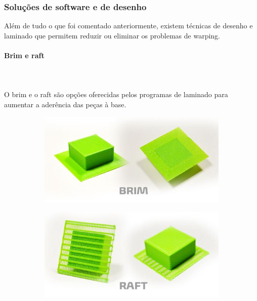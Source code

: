 \documentclass[11pt,a4paper]{article}
\begin{document}
		\subsubsection{Soluções de software e de desenho}Além de tudo o que foi comentado anteriormente, existem técnicas de desenho e laminado que permitem reduzir ou eliminar os problemas de warping.
			\paragraph{Brim e raft}\mbox{}\\\\
O brim e o raft são opções oferecidas pelos programas de laminado para aumentar a aderência das peças à base.
\begin{figure}[H]
    \centering
    \begin{subfigure}[b]{0.4\textwidth}
        \includegraphics[width=\textwidth,cfbox=azul_marcos 4pt 0pt]{FOTOS/BRIM}
    \end{subfigure}
    \qquad %
    \begin{subfigure}[b]{0.4\textwidth}
        \includegraphics[width=\textwidth,cfbox=azul_marcos 4pt 0pt]{FOTOS/RAFT}
    \end{subfigure}   
\end{figure}
\end{document}

